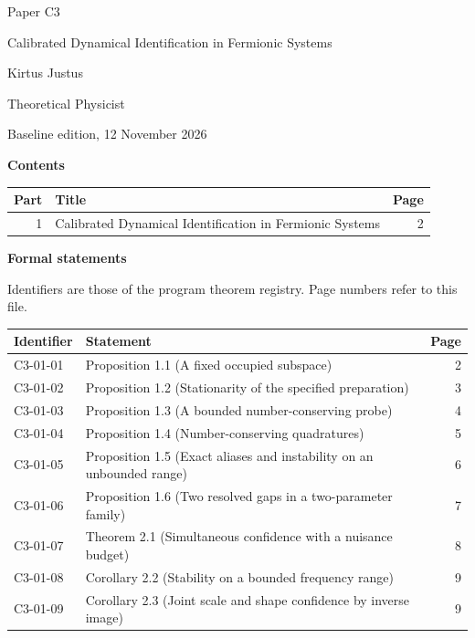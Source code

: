 \documentclass[11pt,a4paper]{article}
\begin{document}
\thispagestyle{empty}\pagestyle{empty}
{\small\sffamily \ProgramTitle\hfill Paper C3\par}
\vspace*{12mm}
{\LARGE\bfseries\raggedright{} Calibrated Dynamical Identification in Fermionic Systems\par}
\vspace{9mm}
{\large Kirtus Justus\par}\vspace{1mm}Theoretical Physicist\par\AuthorLocation\par\vspace{2mm}Baseline edition, 12 November 2026\par\vspace{8mm}
\textbf{Contents}\par\vspace{1mm}
{\small\begin{longtable}{@{}r>{\raggedright\arraybackslash}p{}r@{}}
\toprule Part & Title & Page\\\midrule\endhead
1 & Calibrated Dynamical Identification in Fermionic Systems & 2\\
\bottomrule\end{longtable}}
\vspace{2mm}\textbf{Formal statements}\par\vspace{1mm}
{\footnotesize Identifiers are those of the program theorem registry. Page numbers refer to this file.\par}
{\footnotesize\begin{longtable}{@{}l>{\raggedright\arraybackslash}p{}r@{}}
\toprule Identifier & Statement & Page\\\midrule\endhead
C3-01-01 & Proposition 1.1 (A fixed occupied subspace) & 2\\
C3-01-02 & Proposition 1.2 (Stationarity of the specified preparation) & 3\\
C3-01-03 & Proposition 1.3 (A bounded number-conserving probe) & 4\\
C3-01-04 & Proposition 1.4 (Number-conserving quadratures) & 5\\
C3-01-05 & Proposition 1.5 (Exact aliases and instability on an unbounded range) & 6\\
C3-01-06 & Proposition 1.6 (Two resolved gaps in a two-parameter family) & 7\\
C3-01-07 & Theorem 2.1 (Simultaneous confidence with a nuisance budget) & 8\\
C3-01-08 & Corollary 2.2 (Stability on a bounded frequency range) & 9\\
C3-01-09 & Corollary 2.3 (Joint scale and shape confidence by inverse image) & 9\\
\bottomrule\end{longtable}}
\end{document}
